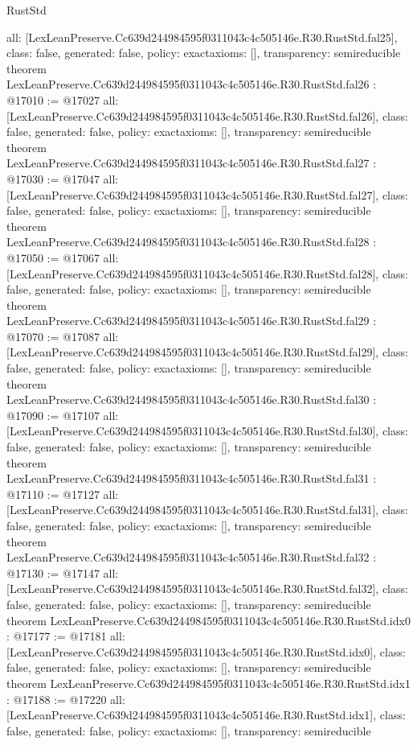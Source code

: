 \begin{lexlean}{RustStd}
\begin{coremodule}
{  all: [LexLeanPreserve.Cc639d244984595f0311043c4c505146e.R30.RustStd.fal25],
  class: false,
  generated: false,
  policy: exact{axioms: []},
  transparency: semireducible
}
theorem LexLeanPreserve.Cc639d244984595f0311043c4c505146e.R30.RustStd.fal26 : @17010 := @17027 {
  all: [LexLeanPreserve.Cc639d244984595f0311043c4c505146e.R30.RustStd.fal26],
  class: false,
  generated: false,
  policy: exact{axioms: []},
  transparency: semireducible
}
theorem LexLeanPreserve.Cc639d244984595f0311043c4c505146e.R30.RustStd.fal27 : @17030 := @17047 {
  all: [LexLeanPreserve.Cc639d244984595f0311043c4c505146e.R30.RustStd.fal27],
  class: false,
  generated: false,
  policy: exact{axioms: []},
  transparency: semireducible
}
theorem LexLeanPreserve.Cc639d244984595f0311043c4c505146e.R30.RustStd.fal28 : @17050 := @17067 {
  all: [LexLeanPreserve.Cc639d244984595f0311043c4c505146e.R30.RustStd.fal28],
  class: false,
  generated: false,
  policy: exact{axioms: []},
  transparency: semireducible
}
theorem LexLeanPreserve.Cc639d244984595f0311043c4c505146e.R30.RustStd.fal29 : @17070 := @17087 {
  all: [LexLeanPreserve.Cc639d244984595f0311043c4c505146e.R30.RustStd.fal29],
  class: false,
  generated: false,
  policy: exact{axioms: []},
  transparency: semireducible
}
theorem LexLeanPreserve.Cc639d244984595f0311043c4c505146e.R30.RustStd.fal30 : @17090 := @17107 {
  all: [LexLeanPreserve.Cc639d244984595f0311043c4c505146e.R30.RustStd.fal30],
  class: false,
  generated: false,
  policy: exact{axioms: []},
  transparency: semireducible
}
theorem LexLeanPreserve.Cc639d244984595f0311043c4c505146e.R30.RustStd.fal31 : @17110 := @17127 {
  all: [LexLeanPreserve.Cc639d244984595f0311043c4c505146e.R30.RustStd.fal31],
  class: false,
  generated: false,
  policy: exact{axioms: []},
  transparency: semireducible
}
theorem LexLeanPreserve.Cc639d244984595f0311043c4c505146e.R30.RustStd.fal32 : @17130 := @17147 {
  all: [LexLeanPreserve.Cc639d244984595f0311043c4c505146e.R30.RustStd.fal32],
  class: false,
  generated: false,
  policy: exact{axioms: []},
  transparency: semireducible
}
theorem LexLeanPreserve.Cc639d244984595f0311043c4c505146e.R30.RustStd.idx0 : @17177 := @17181 {
  all: [LexLeanPreserve.Cc639d244984595f0311043c4c505146e.R30.RustStd.idx0],
  class: false,
  generated: false,
  policy: exact{axioms: []},
  transparency: semireducible
}
theorem LexLeanPreserve.Cc639d244984595f0311043c4c505146e.R30.RustStd.idx1 : @17188 := @17220 {
  all: [LexLeanPreserve.Cc639d244984595f0311043c4c505146e.R30.RustStd.idx1],
  class: false,
  generated: false,
  policy: exact{axioms: []},
  transparency: semireducible
}
\end{coremodule}
\end{lexlean}
